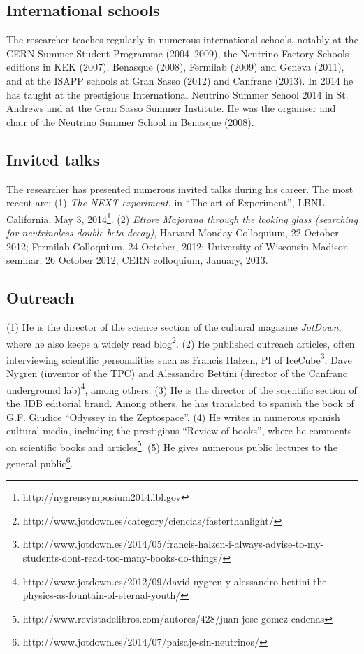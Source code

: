 \documentclass[a4paper,11pt,oneside]{article}
\begin{document}
\subsection{International schools}
The researcher teaches regularly in numerous international schools, notably at the CERN Summer Student Programme (2004--2009), the 
Neutrino Factory Schools editions in KEK (2007), Benasque (2008), Fermilab (2009) and Geneva (2011), and at the ISAPP schools at
Gran Sasso (2012) and Canfranc (2013). In 2014 he has taught at the prestigious International Neutrino Summer School 2014 in St. Andrews and at the Gran Sasso Summer Institute. He was the organiser and chair of the Neutrino Summer School in Benasque (2008).

\subsection{Invited talks}
The researcher has presented numerous invited talks during his career. The most recent are: 
(1) {\em The NEXT experiment}, in ``The art of Experiment'', LBNL, California, May 3, 2014\footnote{http://nygrensymposium2014.lbl.gov}. 
(2) \textit{Ettore Majorana through the looking glass (searching for neutrinoless double beta decay)}, Harvard Monday Colloquium, 22 October 2012; Fermilab Colloquium, 24 October, 2012; University of Wisconsin Madison seminar, 26 October 2012, CERN colloquium, January, 2013.

\subsection{Outreach}
(1) He is the director of the science section of the cultural magazine {\em JotDown}, where he
also keeps a widely read blog\footnote{http://www.jotdown.es/category/ciencias/fasterthanlight/}.
(2) He published outreach articles, often interviewing scientific personalities such as Francis Halzen, PI of IceCube\footnote{http://www.jotdown.es/2014/05/francis-halzen-i-always-advise-to-my-students-dont-read-too-many-books-do-things/}, Dave Nygren (inventor of the TPC) and Alessandro Bettini (director of the Canfranc underground lab)\footnote{http://www.jotdown.es/2012/09/david-nygren-y-alessandro-bettini-the-physics-as-fountain-of-eternal-youth/}, among others. (3) He is the director of the scientific section of the JDB editorial brand. Among others, he has translated to spanish the book of G.F. Giudice ``Odyssey in the Zeptospace''. (4) He writes in numerous spanish cultural media, including the prestigious ``Review of books'', where he comments on scientific books and articles\footnote{http://www.revistadelibros.com/autores/428/juan-jose-gomez-cadenas}. (5) He gives numerous public lectures to the general public\footnote{
http://www.jotdown.es/2014/07/paisaje-sin-neutrinos/}.  
\end{document}
